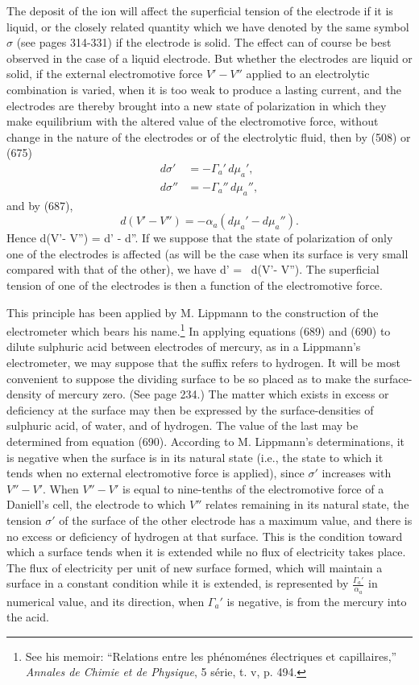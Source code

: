 \documentclass[12pt]{memoir}
\begin{document}
The deposit of the ion will affect the superficial tension of the electrode if it is liquid, or the closely related quantity which we have denoted by the same symbol $\sigma$ (see pages 314-331) if the electrode is solid. The effect can of course be best observed in the case of a liquid  electrode. But whether the electrodes are liquid or solid, if the external electromotive force $V'- V''$ applied to an electrolytic combination is varied, when it is too weak to produce a lasting current, and the electrodes are thereby brought into a new state of polarization in which they make equilibrium with the altered value of the electromotive force, without change in the nature of the electrodes or of the electrolytic fluid, then by (508) or (675)
\begin{align*}
d\sigma' &= - \Gamma_a'\,d\mu_a', \\
d\sigma'' &= - \Gamma_a''\,d\mu_a'',\end{align*}
and by (687),
$$ d( V'- V'') =-\alpha_a(d\mu_a'-d\mu_a'').$$
Hence
\eqs d(V'- V'') =  d\sigma' -  d\sigma''.   \label{689} \eqe
If we suppose that the state of polarization of only one of the electrodes is affected (as will be the case when its surface is very small compared with that of the other), we have
\eqs d\sigma' =   \, d(V'- V'').   \label{690} \eqe
The superficial tension of one of the electrodes is then a function of the electromotive force.

This principle has been applied by M. Lippmann to the construction of the electrometer which bears his name.\footnote{See his memoir: ``Relations entre les ph\'{e}nom\'{e}nes \'{e}lectriques et capillaires,'' \textit{Annales de Chimie et de Physique}, 5 s\'{e}rie, t. v, p. 494.} In applying equations (689) and (690) to dilute sulphuric acid between electrodes of mercury, as in a Lippmann's electrometer, we may suppose that the suffix refers to hydrogen. It will be most convenient to suppose the dividing surface to be so placed as to make the surface-density of mercury zero. (See page 234.) The matter which exists in excess or deficiency at the surface may then be expressed by the surface-densities of sulphuric acid, of water, and of hydrogen. The value of the last may be determined from equation (690). According to M. Lippmann's determinations, it is negative when the surface is in its natural state (i.e., the state to which it tends when no external electromotive force is applied), since $\sigma'$ increases with $V''- V'$. When $V''- V'$ is equal to nine-tenths of the electromotive force of a Daniell's cell, the electrode to which $V''$ relates remaining in its natural state, the tension $\sigma'$ of the surface of the other electrode has a maximum value, and there is no excess or deficiency of hydrogen at that surface. This is the condition toward which a surface tends when it is extended while no flux of electricity takes place. The flux of electricity per unit of new surface formed, which will maintain a surface in a constant condition while it is extended, is represented by $\frac{\Gamma_a'}{\alpha_a}$ in numerical value, and its direction, when $\Gamma_a'$ is negative, is from the mercury into the acid.
\end{document}

